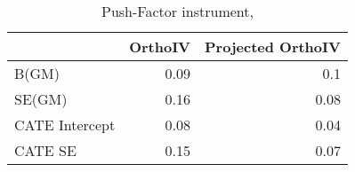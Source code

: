\begin{table}\centering\caption{Push-Factor instrument, }\begin{tabular}{lrr}
\toprule
                &   OrthoIV &   Projected OrthoIV \\
\midrule
 B(GM)          &      0.09 &                0.1  \\
 SE(GM)         &      0.16 &                0.08 \\
 CATE Intercept &      0.08 &                0.04 \\
 CATE SE        &      0.15 &                0.07 \\
\bottomrule
\end{tabular}\end{table}